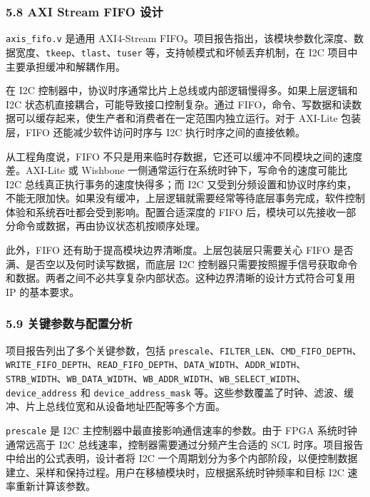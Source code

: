 \subsubsection{5.8 AXI Stream FIFO 设计}\label{axi-stream-fifo-ux8bbeux8ba1}

\texttt{axis\_fifo.v} 是通用 AXI4-Stream FIFO。项目报告指出，该模块参数化深度、数据宽度、\texttt{tkeep}、\texttt{tlast}、\texttt{tuser} 等，支持帧模式和坏帧丢弃机制，在 I2C 项目中主要承担缓冲和解耦作用。

在 I2C 控制器中，协议时序通常比片上总线或内部逻辑慢得多。如果上层逻辑和 I2C 状态机直接耦合，可能导致接口控制复杂。通过 FIFO，命令、写数据和读数据可以缓存起来，使生产者和消费者在一定范围内独立运行。对于 AXI-Lite 包装层，FIFO 还能减少软件访问时序与 I2C 执行时序之间的直接依赖。

从工程角度说，FIFO 不只是用来临时存数据，它还可以缓冲不同模块之间的速度差。AXI-Lite 或 Wishbone 一侧通常运行在系统时钟下，写命令的速度可能比 I2C 总线真正执行事务的速度快得多；而 I2C 又受到分频设置和协议时序约束，不能无限加快。如果没有缓冲，上层逻辑就需要经常等待底层事务完成，软件控制体验和系统吞吐都会受到影响。配置合适深度的 FIFO 后，模块可以先接收一部分命令或数据，再由协议状态机按顺序处理。

此外，FIFO 还有助于提高模块边界清晰度。上层包装层只需要关心 FIFO 是否满、是否空以及何时读写数据，而底层 I2C 控制器只需要按照握手信号获取命令和数据。两者之间不必共享复杂内部状态。这种边界清晰的设计方式符合可复用 IP 的基本要求。

\subsubsection{5.9 关键参数与配置分析}\label{ux5173ux952eux53c2ux6570ux4e0eux914dux7f6eux5206ux6790}

项目报告列出了多个关键参数，包括 \texttt{prescale}、\texttt{FILTER\_LEN}、\texttt{CMD\_FIFO\_DEPTH}、\texttt{WRITE\_FIFO\_DEPTH}、\texttt{READ\_FIFO\_DEPTH}、\texttt{DATA\_WIDTH}、\texttt{ADDR\_WIDTH}、\texttt{STRB\_WIDTH}、\texttt{WB\_DATA\_WIDTH}、\texttt{WB\_ADDR\_WIDTH}、\texttt{WB\_SELECT\_WIDTH}、\texttt{device\_address} 和 \texttt{device\_address\_mask} 等。这些参数覆盖了时钟、滤波、缓冲、片上总线位宽和从设备地址匹配等多个方面。

\texttt{prescale} 是 I2C 主控制器中最直接影响通信速率的参数。由于 FPGA 系统时钟通常远高于 I2C 总线速率，控制器需要通过分频产生合适的 SCL 时序。项目报告中给出的公式表明，设计者将 I2C 一个周期划分为多个内部阶段，以便控制数据建立、采样和保持过程。用户在移植模块时，应根据系统时钟频率和目标 I2C 速率重新计算该参数。

